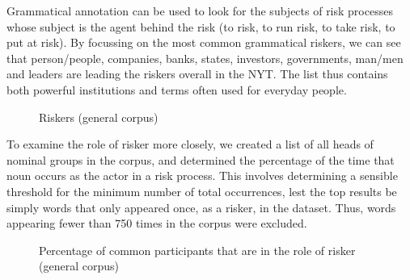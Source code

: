 Grammatical annotation can be used to look for the subjects of risk processes whose subject is the agent behind the risk (to risk, to run risk, to take risk, to put at risk). By focussing on the most common grammatical riskers, we can see that person\slash people, companies, banks, states, investors, governments, man\slash men and leaders are leading the riskers overall in the NYT. The list thus contains both powerful institutions and terms often used for everyday people. 

\begin{figure}[htb!]
\centering
{}
\caption{Riskers (general corpus)}
\end{figure}

To examine the role of risker more closely, we created a list of all heads of nominal groups in the corpus, and determined the percentage of the time that noun occurs as the actor in a risk process. This involves determining a sensible threshold for the minimum number of total occurrences, lest the top results be simply words that only appeared once, as a risker, in the dataset. Thus, words appearing fewer than 750 times in the corpus were excluded.

\begin{figure}[htb!]
\centering
{}
\caption{Percentage of common participants that are in the role of risker (general corpus)}
\end{figure}

